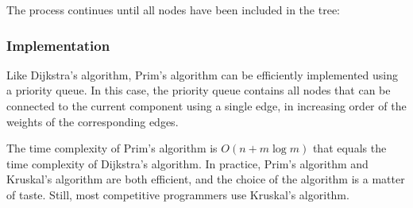 \begin{samepage}
The process continues until all nodes have been included in the tree:
\begin{center}
\end{center}
\end{samepage}

\subsubsection{Implementation}

Like Dijkstra's algorithm, Prim's algorithm can be
efficiently implemented using a priority queue.
In this case, the priority queue contains all nodes
that can be connected to the current component using
a single edge, in increasing order of the weights
of the corresponding edges.

The time complexity of Prim's algorithm is
$O(n + m \log m)$ that equals the time complexity
of Dijkstra's algorithm.
In practice, Prim's algorithm and Kruskal's algorithm
are both efficient, and the choice of the algorithm
is a matter of taste.
Still, most competitive programmers use Kruskal's algorithm.